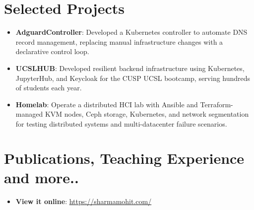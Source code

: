 \documentclass[letterpaper,11pt]{article}
\newcommand{\resumeItem}[2]{\item\small{\textbf{#1}{: #2 \vspace{-2pt}}}}
\newcommand{\resumeSubItem}[2]{\resumeItem{#1}{#2}\vspace{-4pt}}
\newcommand{\resumeSubHeadingListStart}{\begin{itemize}[leftmargin=*]}
\newcommand{\resumeSubHeadingListEnd}{\end{itemize}}
\begin{document}
\section{\color[HTML]{DF691A} Selected Projects}
\resumeSubHeadingListStart
\resumeSubItem{AdguardController}{Developed a Kubernetes controller to automate DNS record management, replacing manual infrastructure changes with a declarative control loop.}
\resumeSubItem{UCSLHUB}{Developed resilient backend infrastructure using Kubernetes, JupyterHub, and Keycloak for the CUSP UCSL bootcamp, serving hundreds of students each year.}
\resumeSubItem{Homelab}{Operate a distributed HCI lab with Ansible and Terraform-managed KVM nodes, Ceph storage, Kubernetes, and network segmentation for testing distributed systems and multi-datacenter failure scenarios.}
\resumeSubHeadingListEnd

\section{\color[HTML]{DF691A} Publications, Teaching Experience and more..}
\resumeSubHeadingListStart
\resumeItem{View it online}{\href{https://sharmamohit.com/work/}{https://sharmamohit.com/}}
\newline
\resumeSubHeadingListEnd
\end{document}

